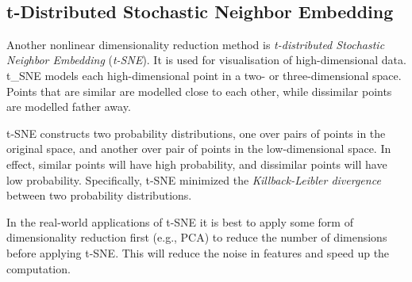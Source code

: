 \documentclass[11pt]{article}
\begin{document}
    \begin{center}
    \end{center}
    { \hspace*{\fill} \\}
    
    \subsection{t-Distributed Stochastic Neighbor
Embedding}\label{t-distributed-stochastic-neighbor-embedding}

Another nonlinear dimensionality reduction method is \emph{t-distributed
Stochastic Neighbor Embedding} (\emph{t-SNE}). It is used for
visualisation of high-dimensional data. t\_SNE models each
high-dimensional point in a two- or three-dimensional space. Points that
are similar are modelled close to each other, while dissimilar points
are modelled father away.

t-SNE constructs two probability distributions, one over pairs of points
in the original space, and another over pair of points in the
low-dimensional space. In effect, similar points will have high
probability, and dissimilar points will have low probability.
Specifically, t-SNE minimized the \emph{Killback-Leibler divergence}
between two probability distributions.

In the real-world applications of t-SNE it is best to apply some form of
dimensionality reduction first (e.g., PCA) to reduce the number of
dimensions before applying t-SNE. This will reduce the noise in features
and speed up the computation.
\end{document}

